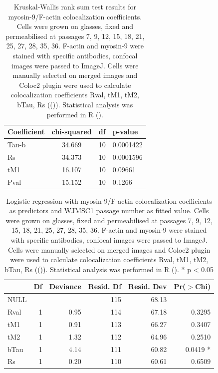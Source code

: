 \documentclass[alpha-refs]{wiley-article}
\begin{document}
\begin{table}[hbt!]
  \caption{Kruskal-Wallis rank sum test results for myosin-9/F-actin colocalization coefficients. Cells were grown on glasses, fixed and permeabilised at passages 7, 9, 12, 15, 18, 21, 25, 27, 28, 35, 36. F-actin and myosin-9 were stained with specific antibodies, confocal images were passed to ImageJ. Cells were manually selected on merged images and Coloc2 plugin were used to calculate colocalization coefficients Rval, tM1, tM2, bTau, Rs ((\cite{rueden2017imagej2})). Statistical analysis was performed in R (\cite{team2014r}).}
\centering
\begin{tabular}{|l|c|c|l|}
    \hline
 Coefficient & chi-squared & df & p-value  \\
   \hline
 Tau-b & 34.669 & 10 & 0.0001422 \\
 Rs & 34.373 & 10 &  0.0001596 \\
 tM1 & 16.107 & 10 & 0.09661 \\
 Pval & 15.152 & 10 & 0.1266
\end{tabular}
\end{table}

\begin{table}[hbt!]
  \caption{Logistic regression with myosin-9/F-actin colocalization coefficients as predictors and WJMSC1 passage number as fitted value. Cells were grown on glasses, fixed and permeabilised at passages 7, 9, 12, 15, 18, 21, 25, 27, 28, 35, 36. F-actin and myosin-9 were stained with specific antibodies, confocal images were passed to ImageJ. Cells were manually selected on merged images and Coloc2 plugin were used to calculate colocalization coefficients Rval, tM1, tM2, bTau, Rs ((\cite{rueden2017imagej2})). Statistical analysis was performed in R (\cite{team2014r}). * p < 0.05}
\centering
\begin{tabular}{lrrrrr}
  \hline
 & Df & Deviance & Resid. Df & Resid. Dev & Pr($>$Chi) \\
  \hline
NULL &  &  & 115 & 68.13 &  \\
  Rval & 1 & 0.95 & 114 & 67.18 & 0.3295 \\
  tM1 & 1 & 0.91 & 113 & 66.27 & 0.3407 \\
  tM2 & 1 & 1.32 & 112 & 64.96 & 0.2510 \\
  bTau & 1 & 4.14 & 111 & 60.82 & 0.0419 * \\
  Rs & 1 & 0.20 & 110 & 60.61 & 0.6509 \\
   \hline
\end{tabular}
\end{table}
\end{document}
